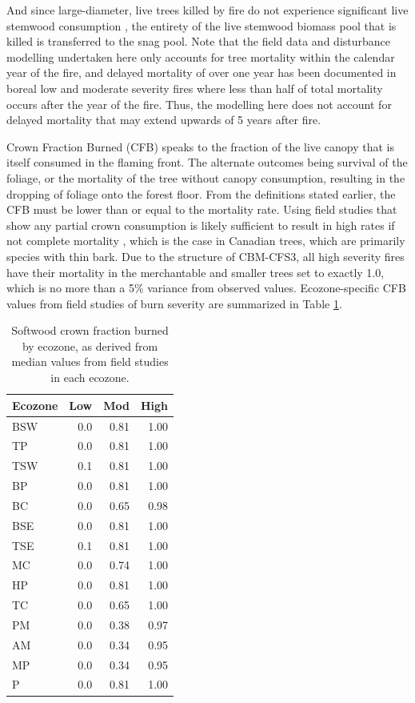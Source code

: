 \documentclass[, manuscript]{copernicus}
\begin{document}
And since large-diameter, live trees killed by fire do not experience
significant live stemwood consumption \citep{talucci2024}, the entirety
of the live stemwood biomass pool that is killed is transferred to the
snag pool. Note that the field data and disturbance modelling undertaken
here only accounts for tree mortality within the calendar year of the
fire, and delayed mortality of over one year has been documented in
boreal low and moderate severity fires \citep{angers2011} where less
than half of total mortality occurs after the year of the fire. Thus,
the modelling here does not account for delayed mortality that may
extend upwards of 5 years after fire.

Crown Fraction Burned (CFB) speaks to the fraction of the live canopy
that is itself consumed in the flaming front. The alternate outcomes
being survival of the foliage, or the mortality of the tree without
canopy consumption, resulting in the dropping of foliage onto the forest
floor. From the definitions stated earlier, the CFB must be lower than
or equal to the mortality rate. Using field studies that show any
partial crown consumption is likely sufficient to result in high rates
if not complete mortality \citep{hood2017}, which is the case in
Canadian trees, which are primarily species with thin bark. Due to the
structure of CBM-CFS3, all high severity fires have their mortality in
the merchantable and smaller trees set to exactly 1.0, which is no more
than a 5\% variance from observed values. Ecozone-specific CFB values
from field studies of burn severity are summarized in Table
\ref{tab:tab-CFBByEcozone}.

\begin{table}
\centering
\caption{\label{tab:tab-CFBByEcozone}Softwood crown fraction burned by ecozone, as derived from median values from field studies in each ecozone.}
\centering
\begin{tabular}[t]{l|r|r|r}
\hline
Ecozone & Low & Mod & High\\
\hline
BSW & 0.0 & 0.81 & 1.00\\
\hline
TP & 0.0 & 0.81 & 1.00\\
\hline
TSW & 0.1 & 0.81 & 1.00\\
\hline
BP & 0.0 & 0.81 & 1.00\\
\hline
BC & 0.0 & 0.65 & 0.98\\
\hline
BSE & 0.0 & 0.81 & 1.00\\
\hline
TSE & 0.1 & 0.81 & 1.00\\
\hline
MC & 0.0 & 0.74 & 1.00\\
\hline
HP & 0.0 & 0.81 & 1.00\\
\hline
TC & 0.0 & 0.65 & 1.00\\
\hline
PM & 0.0 & 0.38 & 0.97\\
\hline
AM & 0.0 & 0.34 & 0.95\\
\hline
MP & 0.0 & 0.34 & 0.95\\
\hline
P & 0.0 & 0.81 & 1.00\\
\hline
\end{tabular}
\end{table}
\end{document}
